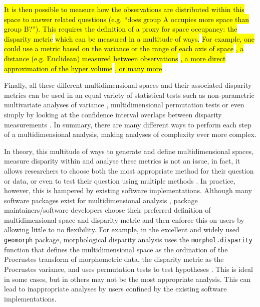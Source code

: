 \documentclass[12pt,letterpaper]{article}
\begin{document}
\hl{It is then possible to measure how the observations are distributed within this space to answer related questions (e.g. ``does group A occupies more space than group B?'').
This requires the definition of a proxy for space occupancy: the disparity metric}
\citep[or index;][]{Hopkins2017}
\hl{which can be measured in a multitude of ways.}
\hl{For example, one could use a metric based on the variance or the range of each axis of space}
\citep{Wills2001, Ciampaglio2001}
\hl{, a distance (e.g. Euclidean) measured between observations}
\citep{foote1993contributions,Foote29111996}
\hl{, a more direct approximation of the hyper volume }
\citep{cornwell2006trait,DonohueDim}
\hl{, or many more }
\citep[e.g.][]{Navarrro2003MDA}.

Finally, all these different multidimensional spaces and their associated disparity metrics can be used in an equal variety of statistical tests such as non-parametric multivariate analyses of variance \citep[e.g.][]{Brusatte12092008}, multidimensional permutation tests \citep[e.g.][]{diaz2016global} or even simply by looking at the confidence interval overlaps between disparity measurements \citep[e.g.][]{halliday2016eutherian}.
In summary, there are many different ways to perform each step of a multidimensional analysis, making analyses of complexity ever more complex.

In theory, this multitude of ways to generate and define multidimensional spaces, measure disparity within and analyse these metrics is not an issue, in fact, it allows researchers to choose both the most appropriate method for their question or data, or even to test their question using multiple methods \citep[such as][for biogeography]{matzke2013biogeobears}.
In practice, however, this is hampered by existing software implementations.
Although many software packages exist for multidimensional analysis \citep[e.g.][]{bouxin2005ginkgo,de2007ginkgo,oksanen2007vegan,adams2013geomorph,Claddis,adams2017geometric}, package maintainers/software developers choose their preferred definition of multidimensional space and disparity metric and then enforce this on users by allowing little to no flexibility.
For example, in the excellent and widely used \texttt{geomorph} package, morphological disparity analysis uses the \texttt{morphol.disparity} function that defines the multidimensional space as the ordination of the Procrustes transform of morphometric data, the disparity metric as the Procrustes variance, and uses permutation tests to test hypotheses \citep{zelditch2012geometric,adams2013geomorph,adams2017geometric}.
This is ideal in some cases, but in others may not be the most appropriate analysis.
This can lead to inappropriate analyses by users confined by the existing software implementations. %
\end{document}
